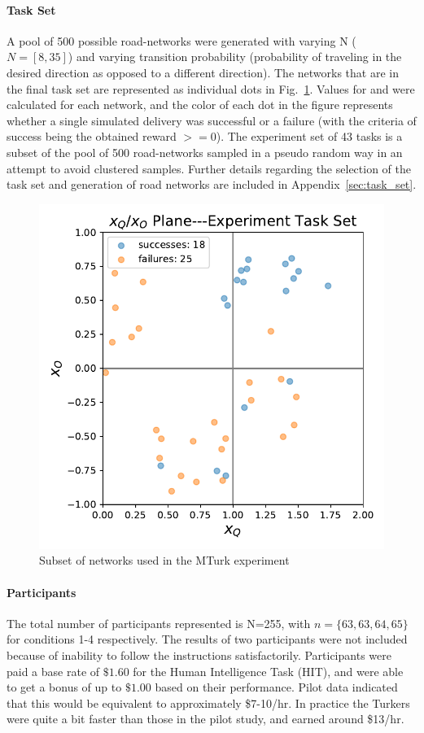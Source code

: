     \noindent \paragraph{Task Set}
    A pool of 500 possible road-networks were generated with varying N ($N=[8,35]$) and varying transition probability (probability of traveling in the desired direction as opposed to a different direction). The networks that are in the final task set are represented as individual dots in Fig.~\ref{fig:exp_set}. Values for \xQ{} and \xO{} were calculated for each network, and the color of each dot in the figure represents whether a single simulated delivery was successful or a failure (with the criteria of success being the obtained reward $ >= 0$). The experiment set of 43 tasks is a subset of the pool of 500 road-networks sampled in a pseudo random way in an attempt to avoid clustered samples. Further details regarding the selection of the task set and generation of road networks are included in Appendix~\ref{sec:task_set}.

    \begin{figure}[tbp]
        \centering
        \includegraphics[width=0.9\linewidth]{Figures/xQxO_plane_experiment_set.pdf}
        \caption{Subset of networks used in the MTurk experiment}
        \label{fig:exp_set}
    \end{figure}

    \noindent \paragraph{Participants}
    The total number of participants represented is N=255, with $n=\{63,63,64,65\}$ for conditions 1-4 respectively. The results of two participants were not included because of inability to follow the instructions satisfactorily. Participants were paid a base rate of $\$1.60$ for the Human Intelligence Task (HIT), and were able to get a bonus of up to $\$1.00$ based on their performance. Pilot data indicated that this would be equivalent to approximately \$7-10/hr. In practice the Turkers were quite a bit faster than those in the pilot study, and earned around \$13/hr.
